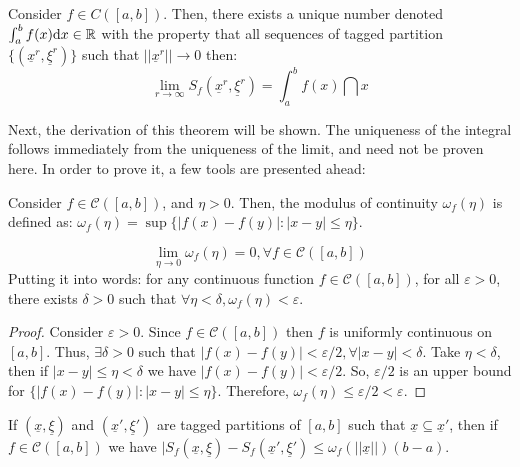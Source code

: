 \newpage

\begin{theorem}
    Consider $f \in C([a,b])$. Then, there exists a unique number denoted $\int_{a}^b f(x)\text{d} x \in \mathbb{R}$ with the property that all sequences of tagged partition $\{(\underline{x}^r, \underline{\xi}^r)\}$ such that $||\underline{x}^r|| \to 0$ then:
    \begin{equation}
        \lim \limits_{r \to \infty} S_f(\underline{x}^r, \underline{\xi}^r) = \int_{a}^b f(x) \dint x
    \end{equation}
\end{theorem}

Next, the derivation of this theorem will be shown. The uniqueness of the integral follows immediately from the uniqueness of the limit, and need not be proven here. In order to prove it, a few tools are presented ahead:

\begin{definition}
    Consider $f \in \mathcal{C}([a,b])$, and $\eta >0$. Then, the modulus of continuity $\omega_f(\eta)$ is defined as: $\omega_f(\eta) = \sup \{|f(x) - f(y)|:|x-y| \leq \eta\}$.
\end{definition}

\begin{theorem}[Theorem I]
    \begin{equation}
        \lim \limits_{\eta \to 0} \omega_f(\eta) = 0, \forall f \in \mathcal{C}([a,b])
    \end{equation}
    Putting it into words: for any continuous function $f \in \mathcal{C}([a,b])$, for all $\varepsilon > 0$, there exists $\delta > 0$ such that $\forall \eta < \delta, \omega_f(\eta)<\varepsilon$.
\end{theorem}

\begin{proof}
    Consider $\varepsilon > 0$. Since $f \in \mathcal{C}([a,b])$ then $f$ is uniformly continuous on $[a,b]$. Thus, $\exists \delta > 0$ such that $|f(x) - f(y)| < \varepsilon/2, \forall |x-y| < \delta$. Take $\eta < \delta$, then if $|x-y| \leq \eta < \delta$ we have $|f(x) - f(y)| < \varepsilon/2$. So, $\varepsilon/2$ is an upper bound for $\{|f(x) - f(y)|:|x-y|\leq \eta\}$. Therefore, $\omega_f(\eta) \leq \varepsilon/2 < \varepsilon$.
\end{proof}

\begin{theorem}[Theorem II]
    If $(\underline{x}, \underline{\xi})$ and $(\underline{x}', \underline{\xi}')$ are tagged partitions of $[a,b]$ such that $\underline{x} \subseteq \underline{x}'$, then if $f \in \mathcal{C}([a,b])$ we have $|S_f(\underline{x}, \underline{\xi}) - S_f(\underline{x}', \underline{\xi}') \leq \omega_f(||\underline{x}||)(b-a)$.
\end{theorem}

